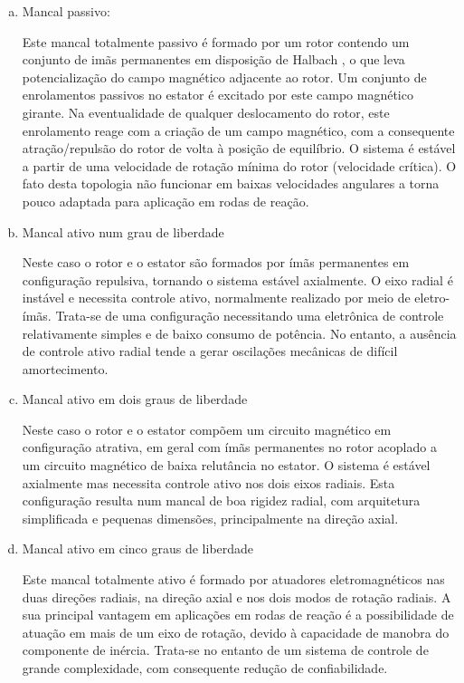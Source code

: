 \begin{enumerate}[a)]
	\item  Mancal passivo:
	
	Este mancal totalmente passivo é formado por um rotor contendo um conjunto de imãs permanentes em disposição de Halbach \citep{Detoni2012}, o que leva potencialização do campo magnético adjacente ao rotor. Um conjunto de enrolamentos passivos no estator é excitado por este campo magnético girante. Na eventualidade de qualquer deslocamento do rotor, este enrolamento reage com a criação de um campo magnético, com a consequente atração/repulsão do rotor de volta à posição de equilíbrio. O sistema é estável a partir de uma velocidade de rotação mínima do rotor (velocidade crítica). O fato desta topologia não funcionar em baixas velocidades angulares a torna pouco adaptada para aplicação em rodas de reação.
	
	\item  Mancal ativo num grau de liberdade
	
	Neste caso o rotor e o estator são formados por ímãs permanentes em configuração repulsiva, tornando o sistema estável axialmente. O eixo radial é instável e necessita controle ativo, normalmente realizado por meio de eletro-ímãs. Trata-se de uma configuração necessitando uma eletrônica de controle relativamente simples e de baixo consumo de potência. No entanto, a ausência de controle ativo radial tende a gerar oscilações mecânicas de difícil amortecimento.
	
	\item Mancal ativo em dois graus de liberdade
	
	Neste caso o rotor e o estator compõem um circuito magnético em configuração atrativa, em geral com ímãs permanentes no rotor acoplado a um circuito magnético de baixa relutância no estator. O sistema é estável axialmente mas necessita controle ativo nos dois eixos radiais. Esta configuração resulta num mancal de boa rigidez radial, com arquitetura simplificada e pequenas dimensões, principalmente na direção axial.
	
	\item Mancal ativo em cinco graus de liberdade
	
	Este mancal totalmente ativo é formado por atuadores eletromagnéticos nas duas direções radiais, na direção axial e nos dois modos de rotação radiais. A sua principal vantagem em aplicações em rodas de reação é a possibilidade de atuação em mais de um eixo de rotação, devido à capacidade de manobra do componente de inércia. Trata-se no entanto de um sistema de controle de grande complexidade, com consequente redução de confiabilidade. 
\end{enumerate}

